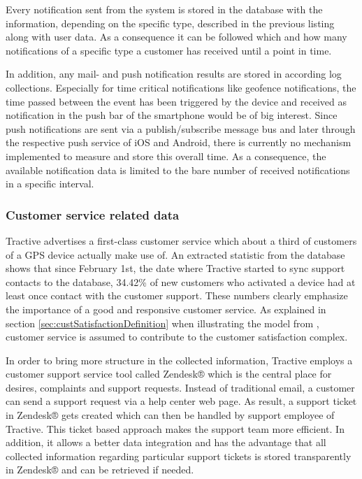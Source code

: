 Every notification sent from the system is stored in the database with the information, depending on the specific type, described in the previous listing along with user data. As a consequence it can be followed which and how many notifications of a specific type a customer has received until a point in time. 

In addition, any mail- and push notification results are stored in according log collections. 
Especially for time critical notifications like geofence notifications, the time passed between the event has been triggered by the device and received as notification in the push bar of the smartphone would be of big interest. Since push notifications are sent via a publish/subscribe message bus and later through the respective push service of iOS and Android, there is currently no mechanism implemented to measure and store this overall time. As a consequence, the available notification data is limited to the bare number of received notifications in a specific interval. 

\subsubsection{Customer service related data}
Tractive advertises a first-class customer service which about a third of customers of a GPS device actually make use of. An extracted statistic from the database shows that since February 1st, the date where Tractive started to sync support contacts to the database, 34.42\% of new customers who activated a device had at least once contact with the customer support. These numbers clearly emphasize the importance of a good and responsive customer service. As explained in section \ref{sec:custSatisfactionDefinition} when illustrating the model from \cite{johnson2001evolution}, customer service is assumed to contribute to the customer satisfaction complex. 

In order to bring more structure in the collected information, Tractive employs a customer support service tool called Zendesk® which is the central place for desires, complaints and support requests. Instead of traditional email, a customer can send a support request via a help center web page. As result, a support ticket in Zendesk® gets created which can then be handled by support employee of Tractive. This ticket based approach makes the support team more efficient. In addition, it allows a better data integration and has the advantage that all collected information regarding particular support tickets is stored transparently in Zendesk® and can be retrieved if needed.

